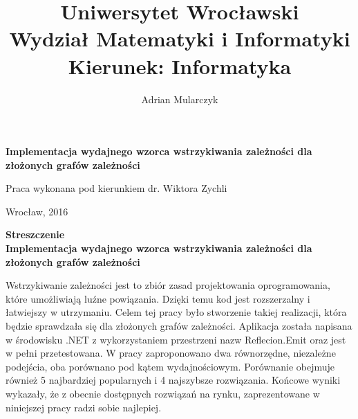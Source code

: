 \documentclass[12pt]{article}
\title{\LARGE{Uniwersytet Wrocławski}\\
\Large{Wydział Matematyki i Informatyki}\\
\large{Kierunek: Informatyka}}
\date{}
\begin{document}
\pagestyle{empty}

\begin{titlepage}
\maketitle
\thispagestyle{empty}


\begin{center}
\author{\LARGE{Adrian Mularczyk}}
\vspace{30pt}

\huge{\textbf{Implementacja wydajnego wzorca wstrzykiwania zależności dla złożonych grafów zależności}}
\vspace{50pt}
\end{center}

\begin{flushright}
\large{Praca wykonana pod kierunkiem}
\large{dr. Wiktora Zychli}
\end{flushright}

\vfill
\begin{center}
\begin{large}
Wrocław, 2016
\end{large}
\end{center}
\end{titlepage}


\setlength{\parindent}{0pt}	%
\setlength{\parskip}{1.5ex} 
\renewcommand*{\figurename}{Rys.}
\renewcommand*{\tablename}{Tab.} 
\renewcommand{\captionsize}{\small}

\setlength{\intextsep}{0pt}


\newpage
\setcounter{page}{2}
\pagestyle{plain}
\textcolor{white}{  }
\begin{center}
\textbf{Streszczenie}\\
\vspace{16pt}
\textbf{Implementacja wydajnego wzorca wstrzykiwania zależności dla złożonych grafów zależności}
\end{center}
Wstrzykiwanie zależności jest to zbiór zasad projektowania oprogramowania, które umożliwiają luźne powiązania. Dzięki temu kod jest rozszerzalny i łatwiejszy w utrzymaniu. Celem tej pracy było stworzenie takiej realizacji, która będzie sprawdzała się dla złożonych grafów zależności. Aplikacja została napisana w środowisku .NET z wykorzystaniem przestrzeni nazw Reflecion.Emit oraz jest w pełni przetestowana. W pracy zaproponowano dwa równorzędne, niezależne podejścia, oba porównano pod kątem wydajnościowym. Porównanie obejmuje również 5 najbardziej popularnych i 4 najszybsze rozwiązania. Końcowe wyniki wykazały, że z obecnie dostępnych rozwiązań na rynku, zaprezentowane w niniejszej pracy radzi sobie najlepiej.
\end{document}
